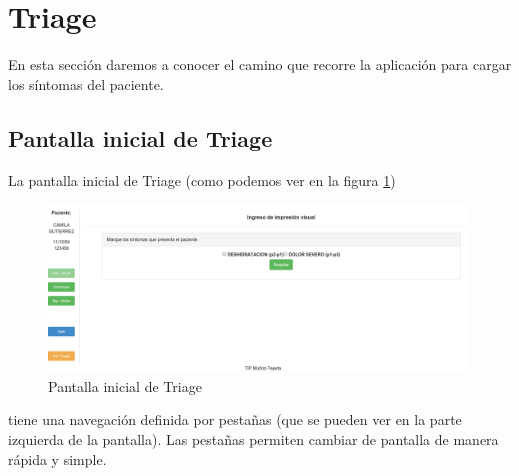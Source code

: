 \section{Triage}
En esta sección daremos a conocer el camino que recorre la aplicación para cargar los síntomas del paciente.

\subsection{Pantalla inicial de Triage}
La pantalla inicial de Triage (como podemos ver en la figura \ref{fig:triage_inicial}) 
\begin{figure}
\centerline{\includegraphics[width=0.99\textwidth]{impresion_visual.png}}
\caption{Pantalla inicial de Triage} \label{fig:triage_inicial}
\end{figure}
tiene una navegación definida por pestañas (que se pueden ver en la parte izquierda de la pantalla). Las pestañas permiten cambiar de pantalla de manera rápida y simple.

